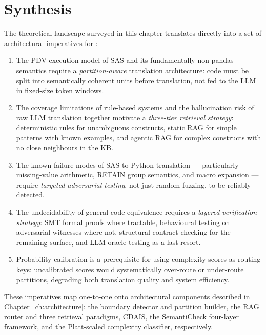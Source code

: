 \section{Synthesis}
\label{sec:ch2-synthesis}

The theoretical landscape surveyed in this chapter translates directly into
a set of architectural imperatives for \codara{}:

\begin{enumerate}
  \item The PDV execution model of SAS and its fundamentally non-pandas semantics
    require a \emph{partition-aware} translation architecture: code must be
    split into semantically coherent units before translation, not fed to the
    \ac{LLM} in fixed-size token windows.

  \item The coverage limitations of rule-based systems and the hallucination
    risk of raw \ac{LLM} translation together motivate a \emph{three-tier
    retrieval strategy}: deterministic rules for unambiguous constructs, static
    \ac{RAG} for simple patterns with known examples, and agentic \ac{RAG} for
    complex constructs with no close neighbours in the \ac{KB}.

  \item The known failure modes of SAS-to-Python translation --- particularly
    missing-value arithmetic, RETAIN group semantics, and macro expansion ---
    require \emph{targeted adversarial testing}, not just random fuzzing, to be
    reliably detected.

  \item The undecidability of general code equivalence requires a
    \emph{layered verification strategy}: \ac{SMT} formal proofs where
    tractable, behavioural testing on adversarial witnesses where not,
    structural contract checking for the remaining surface, and \ac{LLM}-oracle
    testing as a last resort.

  \item Probability calibration is a prerequisite for using complexity scores
    as routing keys: uncalibrated scores would systematically over-route or
    under-route partitions, degrading both translation quality and system
    efficiency.
\end{enumerate}

These imperatives map one-to-one onto architectural components described in
Chapter~\ref{ch:architecture}: the boundary detector and partition builder, the
\ac{RAG} router and three retrieval paradigms, \ac{CDAIS}, the SemantiCheck
four-layer framework, and the Platt-scaled complexity classifier, respectively.

